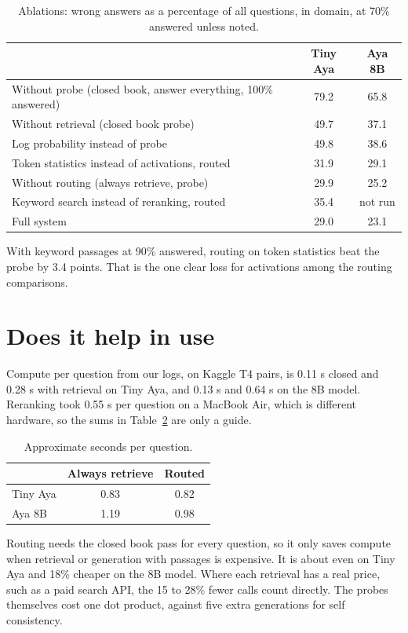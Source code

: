 \documentclass[11pt,a4paper]{article}
\begin{document}
\begin{table}[h]
\centering\small
\caption{Ablations: wrong answers as a percentage of all questions, in domain, at 70\% answered unless noted.}
\label{tab:abl}
\begin{tabular}{lcc}
\toprule
 & Tiny Aya & Aya 8B\\
\midrule
Without probe (closed book, answer everything, 100\% answered) & 79.2 & 65.8\\
Without retrieval (closed book probe) & 49.7 & 37.1\\
Log probability instead of probe & 49.8 & 38.6\\
Token statistics instead of activations, routed & 31.9 & 29.1\\
Without routing (always retrieve, probe) & 29.9 & 25.2\\
Keyword search instead of reranking, routed & 35.4 & not run\\
Full system & 29.0 & 23.1\\
\bottomrule
\end{tabular}
\end{table}

With keyword passages at 90\% answered, routing on token statistics beat the probe by 3.4 points. That is the one clear loss for activations among the routing comparisons.

\section{Does it help in use}

Compute per question from our logs, on Kaggle T4 pairs, is 0.11 s closed and 0.28 s with retrieval on Tiny Aya, and 0.13 s and 0.64 s on the 8B model. Reranking took 0.55 s per question on a MacBook Air, which is different hardware, so the sums in Table~\ref{tab:cost} are only a guide.

\begin{table}[h]
\centering\small
\caption{Approximate seconds per question.}
\label{tab:cost}
\begin{tabular}{lcc}
\toprule
 & Always retrieve & Routed\\
\midrule
Tiny Aya & 0.83 & 0.82\\
Aya 8B & 1.19 & 0.98\\
\bottomrule
\end{tabular}
\end{table}

Routing needs the closed book pass for every question, so it only saves compute when retrieval or generation with passages is expensive. It is about even on Tiny Aya and 18\% cheaper on the 8B model. Where each retrieval has a real price, such as a paid search API, the 15 to 28\% fewer calls count directly. The probes themselves cost one dot product, against five extra generations for self consistency.
\end{document}
